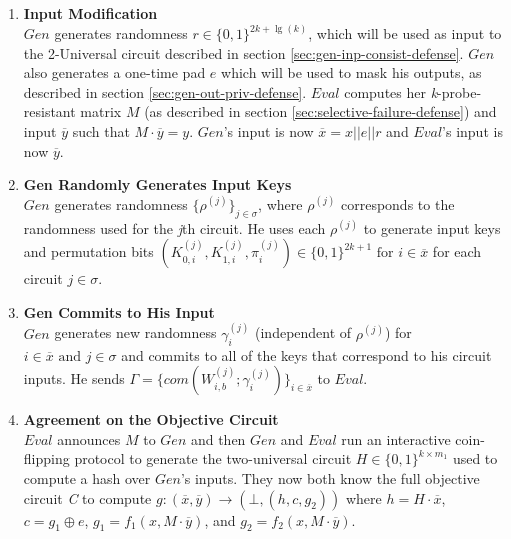 \documentclass{article}
\begin{document}
\begin{enumerate}
	\item \label{step:inputs} \textbf{Input Modification}\\
	$Gen$ generates randomness $r \in \{0,1\}^{2k+\lg(k)}$, which will be used as input to the 2-Universal circuit described in section \ref{sec:gen-inp-consist-defense}. $Gen$ also generates a one-time pad $e$ which will be used to mask his outputs, as described in section \ref{sec:gen-out-priv-defense}. $Eval$ computes her \emph{k}-probe-resistant matrix $M$ (as described in section \ref{sec:selective-failure-defense}) and input $\overline{y}$ such that $M \cdot \overline{y} = y$. $Gen$'s input is now $\overline{x} = x || e || r$ and $Eval$'s input is now $\overline{y}$.
	
	\item \textbf{Gen Randomly Generates Input Keys}\\
	$Gen$ generates randomness $\{\rho^{(j)}\}_{j \in \sigma}$, where $\rho^{(j)}$ corresponds to the randomness used for the \emph{j}th circuit. He uses each $\rho^{(j)}$ to generate input keys and permutation bits $(K_{0,i}^{(j)},K_{1,i}^{(j)},\pi_{i}^{(j)}) \in \{0,1\}^{2k+1} \text{ for } i \in \overline{x}$ for each circuit $j \in \sigma$.
	
	\item \label{step:gen-inp-commit} \textbf{Gen Commits to His Input}\\
	$Gen$ generates new randomness $\gamma_{i}^{(j)}$ (independent of $\rho^{(j)}$) for $i \in \overline{x} \text{ and  }j \in \sigma$ and commits to all of the keys that correspond to his circuit inputs. He sends $\Gamma = \{com(W_{i,b}^{(j)};\gamma_{i}^{(j)})\}_{i \in \overline{x}}$ to $Eval$.
	
	\item \textbf{Agreement on the Objective Circuit}\\
	$Eval$ announces $M$ to $Gen$ and then $Gen$ and $Eval$ run an interactive coin-flipping protocol to generate the two-universal circuit $H \in \{0,1\}^{k \times m_1}$ used to compute a hash over $Gen$'s inputs. They now both know the full objective circuit \emph{C} to compute $g : (\overline{x},\overline{y}) \rightarrow (\bot, (h,c,g_2))$ where $h = H \cdot \overline{x}$, $c=g_{1}\oplus e$, $g_{1} = f_{1}(x, M\cdot\overline{y})$, and $g_{2} = f_{2}(x,M\cdot\overline{y})$.
	

\end{enumerate}
\end{document}
